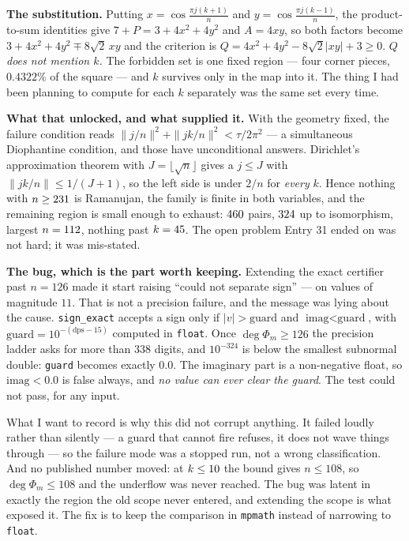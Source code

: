 \documentclass[12pt]{article}
\begin{document}
\textbf{The substitution.} Putting $x=\cos\frac{\pi j(k+1)}{n}$ and
$y=\cos\frac{\pi j(k-1)}{n}$, the product-to-sum identities give
$7+P=3+4x^{2}+4y^{2}$ and $A=4xy$, so both factors become
$3+4x^{2}+4y^{2}\mp8\sqrt2\,xy$ and the criterion is
$Q=4x^{2}+4y^{2}-8\sqrt2|xy|+3\ge0$. \emph{$Q$ does not mention $k$.} The
forbidden set is one fixed region --- four corner pieces, $0.4322\%$ of the
square --- and $k$ survives only in the map into it. The thing I had been
planning to compute for each $k$ separately was the same set every time.

\textbf{What that unlocked, and what supplied it.} With the geometry fixed, the
failure condition reads $\|j/n\|^{2}+\|jk/n\|^{2}<\tau/2\pi^{2}$ --- a
simultaneous Diophantine condition, and those have unconditional answers.
Dirichlet's approximation theorem with $J=\lfloor\sqrt n\rfloor$ gives a
$j\le J$ with $\|jk/n\|\le1/(J+1)$, so the left side is under $2/n$ for
\emph{every} $k$. Hence nothing with $n\ge231$ is Ramanujan, the
family is finite in both variables, and the remaining region is small enough to
exhaust: $460$ pairs, $324$ up to isomorphism, largest
$n=112$, nothing past $k=45$. The open problem Entry 31 ended
on was not hard; it was mis-stated.

\textbf{The bug, which is the part worth keeping.} Extending the exact
certifier past $n=126$ made it start raising ``could not separate sign'' --- on
values of magnitude $11$. That is not a precision failure, and the message was
lying about the cause. \texttt{sign\_exact} accepts a sign only if
$|v|>\text{guard}$ and $\text{imag}<\text{guard}$, with
$\text{guard}=10^{-(\mathrm{dps}-15)}$ computed in \texttt{float}. Once
$\deg\Phi_m\ge126$ the precision ladder asks for more than $338$ digits, and
$10^{-324}$ is below the smallest subnormal double: \texttt{guard} becomes
exactly $0.0$. The imaginary part is a non-negative float, so
$\text{imag}<0.0$ is false always, and \emph{no value can ever clear the
guard}. The test could not pass, for any input.

What I want to record is why this did not corrupt anything. It failed loudly
rather than silently --- a guard that cannot fire refuses, it does not wave
things through --- so the failure mode was a stopped run, not a wrong
classification. And no published number moved: at $k\le10$ the bound
gives $n\le108$, so $\deg\Phi_m\le108$ and the underflow was never reached.
The bug was latent in exactly the region the old scope never entered, and
extending the scope is what exposed it. The fix is to keep the comparison in
\texttt{mpmath} instead of narrowing to \texttt{float}.
\end{document}
